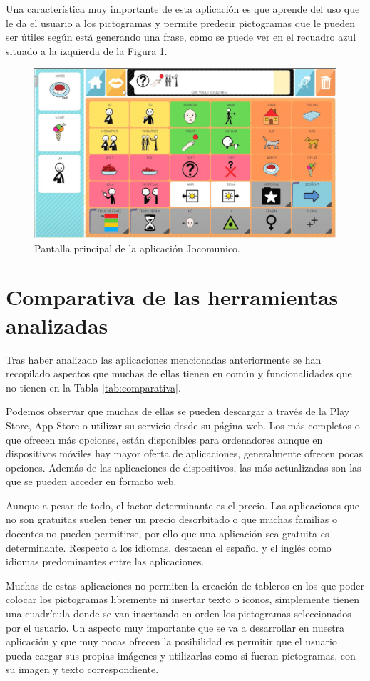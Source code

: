Una característica muy importante de esta aplicación es que aprende del uso que le da el usuario a los pictogramas y permite predecir pictogramas que le pueden ser útiles según está generando una frase, como se puede ver en el recuadro azul situado a la izquierda de la Figura \ref{fig:jocomunico}.

\begin{figure}[h!]
	\centering
	\includegraphics[width=0.7\linewidth]{Imagenes/Bitmap/jocomunico}
	\caption{Pantalla principal de la aplicación Jocomunico.}
	\label{fig:jocomunico}
\end{figure}


\section*{Comparativa de las herramientas analizadas}

Tras haber analizado las aplicaciones mencionadas anteriormente se han recopilado aspectos que muchas de ellas tienen en común y funcionalidades que no tienen en la Tabla \ref{tab:comparativa}.

Podemos observar que muchas de ellas se pueden descargar a través de la Play Store, App Store o utilizar su servicio desde su página web. Los más completos o que ofrecen más opciones, están disponibles para ordenadores aunque en dispositivos móviles hay mayor oferta  de aplicaciones, generalmente ofrecen pocas opciones. Además de las aplicaciones de dispositivos, las más actualizadas son las que se pueden acceder en formato web.

Aunque a pesar de todo, el factor determinante es el precio. Las aplicaciones que no son gratuitas suelen tener un precio desorbitado o que muchas familias o docentes no pueden permitirse, por ello que una aplicación sea gratuita es determinante. Respecto a los idiomas, destacan el español y el inglés como idiomas predominantes entre las aplicaciones. 

Muchas de estas aplicaciones no permiten la creación de tableros en los que poder colocar los pictogramas libremente ni insertar texto o iconos, simplemente tienen una cuadrícula donde se van insertando en orden los pictogramas seleccionados por el usuario. Un aspecto muy importante que se va a desarrollar en nuestra aplicación y que muy pocas ofrecen la posibilidad es permitir que el usuario pueda cargar sus propias imágenes y utilizarlas como si fueran pictogramas, con su imagen y texto correspondiente.

